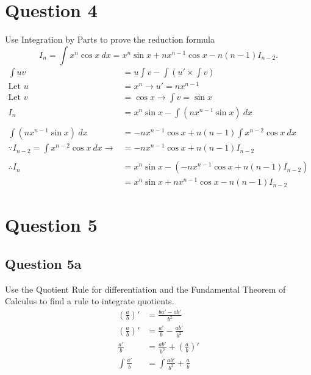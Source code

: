 \documentclass{article}
\begin{document}
\section*{Question 4}
Use Integration by Parts to prove the reduction formula
\[I_n=\int x^n\cos x\:dx=x^n\sin x+nx^{n-1}\cos x-n(n-1)I_{n-2}.\]
\begin{align*}
    \int uv                                                        & =u\int v-\int (u'\times \int v)               \\
    \text{Let }u                                                   & =x^n\rightarrow u'=nx^{n-1}                   \\
    \text{Let }v                                                   & =\cos x\rightarrow \int v=\sin x              \\
    I_n                                                            & =x^n\sin x-\int(nx^{n-1}\sin x)\:dx           \\
    \\
    \int(nx^{n-1}\sin x)\:dx                                       & =-nx^{n-1}\cos x+n(n-1)\int x^{n-2}\cos x\:dx \\
    \because I_{n-2}          = \int x^{n-2}\cos x\:dx \rightarrow & = -nx^{n-1}\cos x+n(n-1)I_{n-2}               \\
    \\
    \therefore I_n                                                 & =x^n\sin x-(-nx^{n-1}\cos x+n(n-1)I_{n-2})    \\
                                                                   & =x^n\sin x+nx^{n-1}\cos x-n(n-1)I_{n-2}
\end{align*}
\section*{Question 5}
\subsection*{Question 5a}
Use the Quotient Rule for differentiation and the Fundamental Theorem of Calculus to find a rule to integrate quotients.
\begin{align*}
    (\frac{a}{b})'   & =\frac{ba'-ab'}{b^2}                \\
    (\frac{a}{b})'   & = \frac{a'}{b}-\frac{ab'}{b^2}      \\
    \frac{a'}{b}     & = \frac{ab'}{b^2} + (\frac{a}{b})'  \\
    \int\frac{a'}{b} & = \int\frac{ab'}{b^2} + \frac{a}{b} \\
\end{align*}
\end{document}
